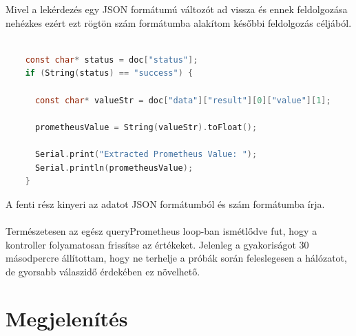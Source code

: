 Mivel a lekérdezés egy JSON formátumú változót ad vissza és ennek feldolgozása nehézkes ezért ezt rögtön szám 
formátumba alakítom későbbi feldolgozás céljából.

\begin{lstlisting}[language=C]
    
    const char* status = doc["status"];
    if (String(status) == "success") {
      
      const char* valueStr = doc["data"]["result"][0]["value"][1];
      
      prometheusValue = String(valueStr).toFloat();

      Serial.print("Extracted Prometheus Value: ");
      Serial.println(prometheusValue);
    }
\end{lstlisting}

A fenti rész kinyeri az adatot JSON formátumból és szám formátumba írja.\\
\\
Természetesen az egész queryPrometheus loop-ban ismétlődve fut, hogy a kontroller folyamatosan frissítse az értékeket. 
Jelenleg a gyakoriságot 30 másodpercre állítottam, hogy ne terhelje a próbák során feleslegesen a hálózatot, 
de gyorsabb válaszidő érdekében ez növelhető.
\section{Megjelenítés}